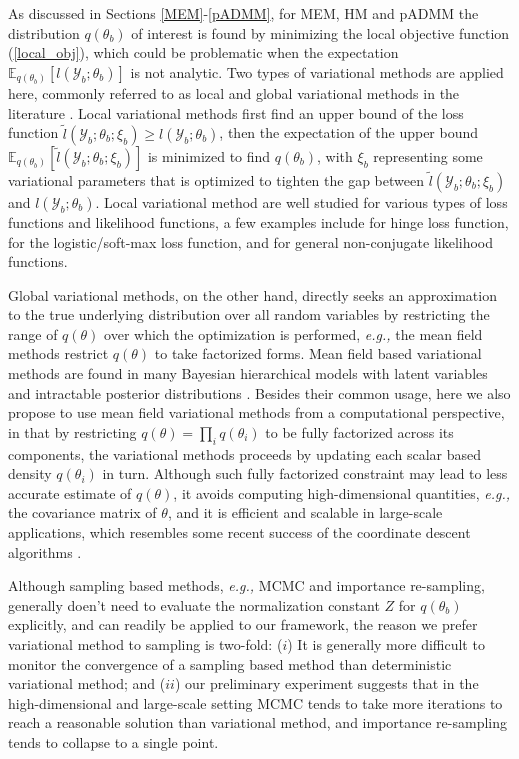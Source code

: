\documentclass{article}
\newcommand{\eg}[0]{\emph{e.g., }}
\newcommand{\1}[0]{\ensuremath{\boldsymbol{1}}\xspace}
\begin{document}
As discussed in Sections \ref{MEM}-\ref{pADMM}, for MEM, HM and pADMM the distribution $q(\theta_b)$ of interest is found by minimizing the local objective function (\ref{local_obj}), which could be problematic when the expectation $\mathbb{E}_{q(\theta_b)}[l(\mathcal{Y}_b; \theta_b)]$ is not analytic. Two types of variational methods are applied here, commonly referred to as local and global variational methods in the literature \cite{Bishop2006}. Local variational methods first find an upper bound of the loss function $\tilde l(\mathcal{Y}_b; \theta_b; \xi_b) \ge  l(\mathcal{Y}_b; \theta_b)$, then the expectation of the upper bound $\mathbb{E}_{q(\theta_b)}[\tilde l(\mathcal{Y}_b; \theta_b; \xi_b)]$ is minimized to find $q(\theta_b)$, with $\xi_b$ representing some variational parameters that is optimized to tighten the gap between $\tilde l(\mathcal{Y}_b; \theta_b; \xi_b)$ and $l(\mathcal{Y}_b; \theta_b)$. Local variational method are well studied for various types of loss functions and likelihood functions, a few examples include \cite{Zhu2012} for hinge loss function, \cite{Jaakkola2000, Khan2010} for the logistic/soft-max loss function, and \cite{Khan2013, Wang2013} for general non-conjugate likelihood functions. 

Global variational methods, on the other hand, directly seeks an approximation to the true underlying distribution over all random variables by restricting the range of $q(\theta)$ over which the optimization is performed, \eg the mean field methods restrict $q(\theta)$ to take factorized forms. Mean field based variational methods are found in many Bayesian hierarchical models with latent variables and intractable posterior distributions \cite{Wainwright2008}. Besides their common usage, here we also propose to use mean field variational methods from a computational perspective, in that by restricting $q(\theta) = \prod_i q(\theta_i)$ to be fully factorized across its components, the variational methods proceeds by updating each scalar based density $q(\theta_i)$ in turn. Although such fully factorized constraint may lead to less accurate estimate of $q(\theta)$, it avoids computing high-dimensional quantities, \eg the covariance matrix of $\theta$, and it is efficient and scalable in large-scale applications, which resembles some recent success of the coordinate descent algorithms \cite{Friedman2010, Bradley2011, Yuan2012, Yu2013}.

Although sampling based methods, \eg MCMC and importance re-sampling, generally doen't need to evaluate the normalization constant $Z$ for $q(\theta_b)$ explicitly, and can readily be applied to our framework, the reason we prefer variational method to sampling is two-fold: ($i$) It is generally more difficult to monitor the convergence of a sampling based method than deterministic variational method; and ($ii$) our preliminary experiment suggests that in the high-dimensional and large-scale setting MCMC tends to take more iterations to reach a reasonable solution than variational method, and importance re-sampling tends to collapse to a single point.
\end{document}
